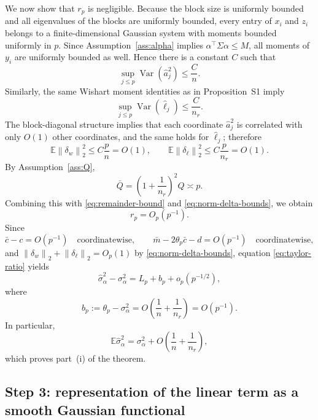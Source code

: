 \documentclass[11pt]{article}
\theoremstyle{definition}
\newcommand{\E}{\mathbb{E}}
\newcommand{\Var}{\operatorname{Var}}
\newcommand{\1}{\mathbf{1}}
\newcommand{\norm}[1]{\left\lVert #1 \right\rVert}
\begin{document}
We now show that $r_p$ is negligible. Because the block size is uniformly bounded and all eigenvalues of the blocks are uniformly bounded, every entry of $x_i$ and $z_i$ belongs to a finite-dimensional Gaussian system with moments bounded uniformly in $p$. Since Assumption~\ref{ass:alpha} implies $\alpha^\top\Sigma\alpha\le M$, all moments of $y_i$ are uniformly bounded as well. Hence there is a constant $C$ such that
\[
 \sup_{j\le p}\Var(\widehat a_j^2)\le \frac{C}{n}.
\]
Similarly, the same Wishart moment identities as in Proposition~S1 imply
\[
 \sup_{j\le p}\Var(\widehat\ell_j)\le \frac{C}{n_r}.
\]
The block-diagonal structure implies that each coordinate $\widehat a_j^2$ is correlated with only $O(1)$ other coordinates, and the same holds for $\widehat\ell_j$; therefore
\begin{equation}\label{eq:norm-delta-bounds}
 \E\norm{\delta_w}_2^2\le C\frac{p}{n}=O(1),
 \qquad
 \E\norm{\delta_\ell}_2^2\le C\frac{p}{n_r}=O(1).
\end{equation}
By Assumption~\ref{ass:Q},
\[
 \bar Q=\left(1+\frac1{n_r}\right)^2Q\asymp p.
\]
Combining this with \eqref{eq:remainder-bound} and \eqref{eq:norm-delta-bounds}, we obtain
\begin{equation}\label{eq:rp-small}
 r_p=O_p(p^{-1}).
\end{equation}
Since
\[
 \bar c-c=O(p^{-1})\quad\text{coordinatewise},
 \qquad
 \bar m-2\theta_p\bar c-d=O(p^{-1})\quad\text{coordinatewise},
\]
and $\norm{\delta_w}_2+\norm{\delta_\ell}_2=O_p(1)$ by \eqref{eq:norm-delta-bounds}, equation \eqref{eq:taylor-ratio} yields
\begin{equation}\label{eq:main-linearization}
 \widehat\sigma_\alpha^2-\sigma_\alpha^2
 =L_p+b_p+o_p(p^{-1/2}),
\end{equation}
where
\begin{equation}\label{eq:bias-term}
 b_p:=\theta_p-\sigma_\alpha^2=O\!\left(\frac1n+\frac1{n_r}\right)=O(p^{-1}).
\end{equation}
In particular,
\[
 \E\widehat\sigma_\alpha^2=\sigma_\alpha^2+O\!\left(\frac1n+\frac1{n_r}\right),
\]
which proves part~(i) of the theorem.

\subsection*{Step 3: representation of the linear term as a smooth Gaussian functional}
\end{document}
